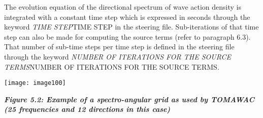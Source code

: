  The evolution equation of the directional spectrum of wave action density is integrated with a constant time step which is expressed in seconds through the keyword \textit{TIME STEP}TIME STEP\textit{ }in the steering file. Sub-iterations of that time step can also be made for computing the source terms (refer to paragraph 6.3). That number of sub-time steps per time step is defined in the steering file through the keyword \textit{NUMBER OF ITERATIONS FOR THE SOURCE TERMS}NUMBER OF ITERATIONS FOR THE SOURCE TERMS\textit{.}

 

 \texttt{[image: image100]}

 \textbf{\textit{Figure 5.2: Example of a spectro-angular grid as used by TOMAWAC (25 frequencies and 12 directions in this case)}}


